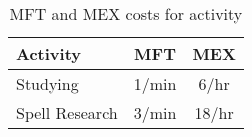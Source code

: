 \begin{table}
	\begin{tabular}{lcc}

	Activity		&	MFT & MEX \\	
\hline
	Studying		  & 1/min & 6/hr \\
	Spell Research	& 3/min & 18/hr \\
    \end{tabular}
    \caption{MFT and MEX costs for activity}
\end{table}
